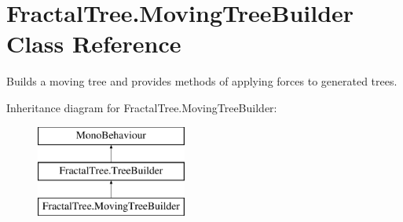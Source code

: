 \hypertarget{class_fractal_tree_1_1_moving_tree_builder}{}\section{Fractal\+Tree.\+Moving\+Tree\+Builder Class Reference}
\label{class_fractal_tree_1_1_moving_tree_builder}


Builds a moving tree and provides methods of applying forces to generated trees.  


Inheritance diagram for Fractal\+Tree.\+Moving\+Tree\+Builder\+:\begin{figure}[H]
\begin{center}
\leavevmode
\includegraphics[height=3.000000cm]{class_fractal_tree_1_1_moving_tree_builder}
\end{center}
\end{figure}
